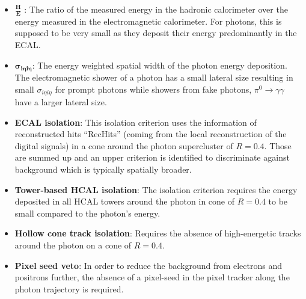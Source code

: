 \begin{itemize}
 \item $\frac{\textbf{H}}{\textbf{E}}$ : The ratio of the measured energy in the hadronic calorimeter over the energy measured in the electromagnetic calorimeter. 
                                                    For photons, this is supposed to be very small as they deposit their energy predominantly in the ECAL.
 \item $\mathbold{\sigma_{i\eta i \eta}}$: The energy weighted spatial width of the photon energy deposition. The electromagnetic shower of a photon has a small lateral size 
                                           resulting in small $\sigma_{i\eta i \eta}$ for prompt photons while showers from fake photons, \eg $\pi^{0} \rightarrow \gamma \gamma$
                                           have a larger lateral size.
 \item \textbf{ECAL isolation}: This isolation criterion uses the information of reconstructed hits ``RecHits'' (coming from the local reconstruction of the digital signals) 
                                in a cone around the photon supercluster of $R=0.4$. Those are summed up and an upper criterion is identified to discriminate against 
                                background which is typically spatially broader.  
 \item \textbf{Tower-based HCAL isolation}: The isolation criterion requires the energy deposited in all HCAL towers around the photon in cone of $R=0.4$ to be small compared to the 
                                            photon's energy. 
 \item \textbf{Hollow cone track isolation}: Requires the absence of high-energetic tracks around the photon on a cone of $R=0.4$.
 \item \textbf{Pixel seed veto}: In order to reduce the background from electrons and positrons further, the absence of a pixel-seed in the pixel tracker along the photon trajectory is required.
\end{itemize}

